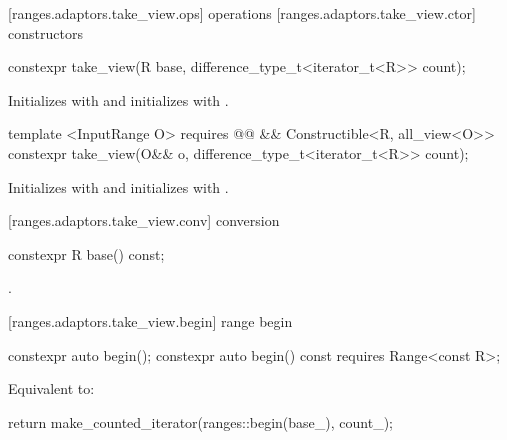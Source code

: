[ranges.adaptors.take_view.ops]{ operations}
[ranges.adaptors.take_view.ctor]{ constructors}

%
\begin{itemdecl}
constexpr take_view(R base, difference_type_t<iterator_t<R>> count);
\end{itemdecl}

\begin{itemdescr}
\pnum
\effects Initializes  with  and initializes
 with .
\end{itemdescr}

%
\begin{itemdecl}
template <InputRange O>
requires @@ &&
    Constructible<R, all_view<O>>
constexpr take_view(O&& o, difference_type_t<iterator_t<R>> count);
\end{itemdecl}

\begin{itemdescr}
\pnum
\effects Initializes  with 
and initializes  with .
\end{itemdescr}

[ranges.adaptors.take_view.conv]{ conversion}

%
\begin{itemdecl}
constexpr R base() const;
\end{itemdecl}

\begin{itemdescr}
\pnum
\returns {}.
\end{itemdescr}

[ranges.adaptors.take_view.begin]{ range begin}

%
\begin{itemdecl}
constexpr auto begin();
constexpr auto begin() const requires Range<const R>;
\end{itemdecl}

\begin{itemdescr}
\pnum
\effects Equivalent to:
\begin{codeblock}
return make_counted_iterator(ranges::begin(base_), count_);
\end{codeblock}
\end{itemdescr}

